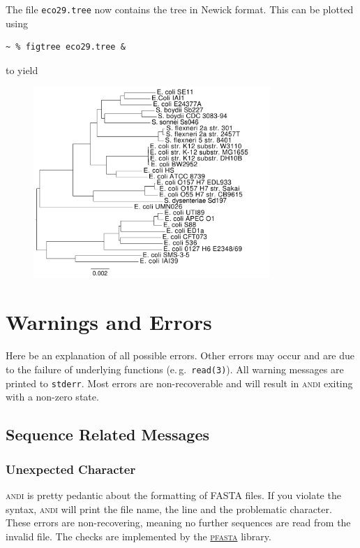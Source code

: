 \documentclass[a4paper,
  10pt,
  english,
  DIV=12,
  BCOR=8mm]{scrbook}
\newcommand{\algo}[1]{\textsc{{#1}}}
\newcommand{\andi}{\algo{andi}\xspace}
\begin{document}
\noindent The file \lstinline$eco29.tree$ now contains the tree in Newick format. This can be plotted using \cite{figtree}

\begin{lstlisting}
~ % figtree eco29.tree &
\end{lstlisting}

\noindent to yield

\begin{figure}[h]
  \centering\includegraphics[width=0.8\textwidth]{andi_labels.pdf}
\end{figure}


\chapter{Warnings and Errors}

Here be an explanation of all possible errors. Other errors may occur and are due to the failure of underlying functions (e.\,g.~\lstinline$read(3)$). All warning messages are printed to \lstinline$stderr$. Most errors are non-recoverable and will result in \andi exiting with a non-zero state.

\section{Sequence Related Messages}

\subsection*{Unexpected Character}

\andi is pretty pedantic about the formatting of \algo{FASTA} files. If you violate the syntax, \andi will print the file name, the line and the problematic character. These errors are non-recovering, meaning no further sequences are read from the invalid file. The checks are implemented by the \href{https://github.com/kloetzl/pfasta}{\algo{pfasta}} library.
\end{document}
